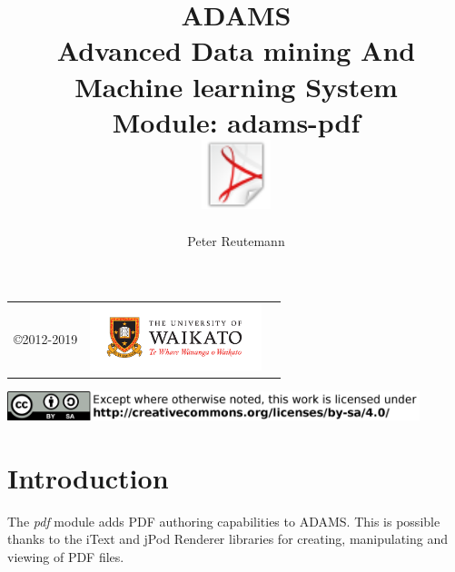 \documentclass[a4paper]{book}
\title{
  \textbf{ADAMS} \\
  {\Large \textbf{A}dvanced \textbf{D}ata mining \textbf{A}nd \textbf{M}achine
  learning \textbf{S}ystem} \\
  {\Large Module: adams-pdf} \\
  \vspace{1cm}
  \includegraphics[width=2cm]{images/pdf-module.png} \\
}
\author{
  Peter Reutemann
}
\begin{document}
\begin{titlepage}
\maketitle

\thispagestyle{empty}
\center
\begin{table}[b]
	\begin{tabular}{c l l}
		\parbox[c][2cm]{2cm}{\copyright 2012-2019} &
		\parbox[c][2cm]{5cm}{\includegraphics[width=5cm]{images/coat_of_arms.pdf}} \\
	\end{tabular}
	\includegraphics[width=12cm]{images/cc.png} \\
\end{table}

\end{titlepage}

\tableofcontents
\listoffigures

\chapter{Introduction}
The \textit{pdf} module adds PDF authoring capabilities to ADAMS. 
This is possible thanks to the iText \cite{itext} and jPod Renderer \cite{jpod} 
libraries for creating, manipulating and viewing of PDF files.

\end{document}
